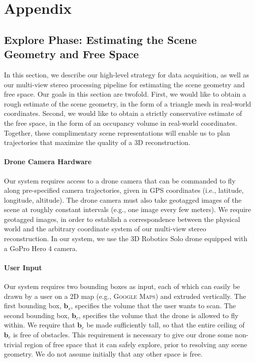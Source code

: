 \section{Appendix}
\label{sec:ch4:appendix}

\subsection{Explore Phase: Estimating the Scene Geometry and Free Space}
\label{sec:ch4:explore}

In this section, we describe our high-level strategy for data acquisition, as well as our multi-view stereo processing pipeline for estimating the scene geometry and free space.
Our goals in this section are twofold.
First, we would like to obtain a rough estimate of the scene geometry, in the form of a triangle mesh in real-world coordinates.
Second, we would like to obtain a strictly conservative estimate of the free space, in the form of an occupancy volume in real-world coordinates.
Together, these complimentary scene representations will enable us to plan trajectories that maximize the quality of a 3D reconstruction.

\paragraph{Drone Camera Hardware}
Our system requires access to a drone camera that can be commanded to fly along pre-specified camera trajectories, given in GPS coordinates (i.e., latitude, longitude, altitude).
The drone camera must also take geotagged images of the scene at roughly constant intervals (e.g., one image every few meters).
We require geotagged images, in order to establish a correspondence between the physical world and the arbitrary coordinate system of our multi-view stereo reconstruction.
In our system, we use the 3D Robotics Solo drone \cite{3dr:2017b} equipped with a GoPro Hero 4 camera.

\paragraph{User Input}
Our system requires two bounding boxes as input, each of which can easily be drawn by a user on a 2D map (e.g., \textsc{Google Maps}) and extruded vertically.
The first bounding box, $\mathbf{b}_s$, specifies the volume that the user wants to scan.
The second bounding box, $\mathbf{b}_c$, specifies the volume that the drone is allowed to fly within.
We require that $\mathbf{b}_c$ be made sufficiently tall, so that the entire ceiling of $\mathbf{b}_c$ is free of obstacles.
This requirement is necessary to give our drone some non-trivial region of free space that it can safely explore, prior to resolving any scene geometry.
We do not assume initially that any other space is free.

